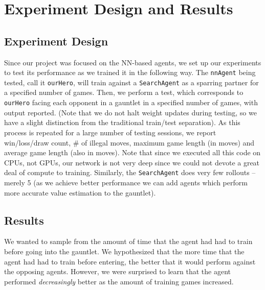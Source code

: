 \section{Experiment Design and Results}

\subsection{Experiment Design}

Since our project was focused on the NN-based agents, we set up our experiments to test its performance as we trained it in the following way.
The \texttt{nnAgent} being tested, call it \texttt{ourHero}, will train against a \texttt{SearchAgent} as a sparring partner for a specified number of games.
Then, we perform a test, which corresponds to \texttt{ourHero} facing each opponent in a gauntlet in a specified number of games, with output reported.
(Note that we do not halt weight updates during testing, so we have a slight distinction from the traditional train/test separation).
As this process is repeated for a large number of testing sessions, we report win/loss/draw count, \# of illegal moves, maximum game length (in moves) and average game length (also in moves).
Note that since we executed all this code on CPUs, not GPUs, our network is not very deep since we could not devote a great deal of compute to training.
Similarly, the \texttt{SearchAgent} does very few rollouts -- merely 5 (as we achieve better performance we can add agents which perform more accurate value estimation to the gauntlet).


\subsection{Results}
We wanted to sample from the amount of time that the agent had had to train before going into the gauntlet.
We hypothesized that the more time that the agent had had to train before entering, the better that it would perform against the opposing agents.
However, we were surprised to learn that the agent performed \emph{decreasingly} better as the amount of training games increased.

%










